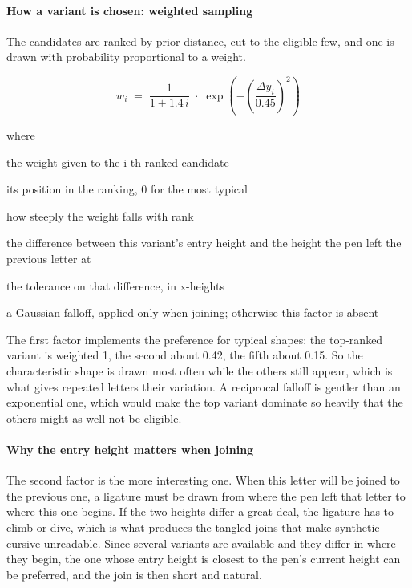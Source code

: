 \paragraph{How a variant is chosen: weighted sampling}
The candidates are ranked by prior distance, cut to the eligible few, and one is drawn with probability proportional to a weight.


\begin{equation}
w_i \;=\; \frac{1}{1 + 1.4\,i} \;\cdot\; \exp\!\left(-\left(\frac{\Delta y_i}{0.45}\right)^{\!2}\right)
\end{equation}

\noindent where
\begin{description}[leftmargin=2.4em,style=nextline,font=\normalfont\ttfamily]\setlength\itemsep{1pt}
  \item[{$w_i$}] \normalfont the weight given to the i-th ranked candidate
  \item[{$i$}] \normalfont its position in the ranking, 0 for the most typical
  \item[{$1.4$}] \normalfont how steeply the weight falls with rank
  \item[{$\Delta y_i$}] \normalfont the difference between this variant's entry height and the height the pen left the previous letter at
  \item[{$0.45$}] \normalfont the tolerance on that difference, in x-heights
  \item[{$\exp(-(\cdot)^2)$}] \normalfont a Gaussian falloff, applied only when joining; otherwise this factor is absent
\end{description}
The first factor implements the preference for typical shapes: the top-ranked variant is weighted 1, the second about 0.42, the fifth about 0.15. So the characteristic shape is drawn most often while the others still appear, which is what gives repeated letters their variation. A reciprocal falloff is gentler than an exponential one, which would make the top variant dominate so heavily that the others might as well not be eligible.


\paragraph{Why the entry height matters when joining}
The second factor is the more interesting one. When this letter will be joined to the previous one, a ligature must be drawn from where the pen left that letter to where this one begins. If the two heights differ a great deal, the ligature has to climb or dive, which is what produces the tangled joins that make synthetic cursive unreadable. Since several variants are available and they differ in where they begin, the one whose entry height is closest to the pen's current height can be preferred, and the join is then short and natural.

